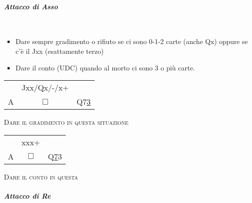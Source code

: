 \documentclass[a4paper,italian]{article}
\newcommand{\cards}[1]{\textsf{#1}}
\newcommand\onesuitenw[3]%
    {%
        \begin{center}%
            \begin{tabular}{>{\hfill}p{3cm}cp{3cm}}%
                & \cards{#2} \\%
                \cards{#1}& $\Box$    & \cards{#3}%
            \end{tabular}%
        \end{center}%
        }
\begin{document}
                                \paragraph{\textit{Attacco di Asso}}\mbox{}\\
                                \vspace{-.4cm}
                                \begin{itemize}
                                    \item Dare sempre gradimento o rifiuto se ci sono 0-1-2 carte (anche Qx) oppure se c’è il Jxx
                                        (esattamente terzo)
                                    \item Dare il conto (UDC) quando al morto ci sono 3 o più carte.
                                \end{itemize}
                                \smallbreak
                                \begin{minipage}[h]{.5\textwidth}

                                    \onesuitenw{A}{Jxx/Qx/-/x+}{Q7\underline{3}}
                                    \vspace{5pt}

                                    \begin{center}
                                        \textsc{Dare il gradimento in questa situazione}
                                    \end{center}
                                \end{minipage}
                                \begin{minipage}[h]{.4\textwidth}

                                    \onesuitenw{A}{xxx+}{Q\underline{7}3}
                                    \vspace{5pt}

                                    \begin{center}
                                        \hspace{3em}\textsc{Dare il conto in questa}
                                    \end{center}

                                \end{minipage}
                                \paragraph{\textit{Attacco di Re}}\mbox{}\\
                                \vspace{-.4cm}
\end{document}
